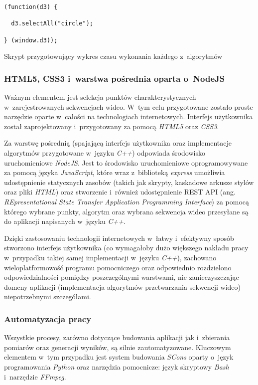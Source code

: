       \begin{sample}[ht]
        \begin{verbatim}
(function(d3) {

  d3.selectAll("circle");

} (window.d3));
        \end{verbatim}
        \caption{Skrypt przygotowujący wykres czasu wykonania każdego z~algorytmów}
        \label{ChartForRunningTimePerAlgorithm}
      \end{sample}

      \subsubsection{HTML5, CSS3 i~warstwa pośrednia oparta o~NodeJS}\label{Subsection_NodeJS}
      Ważnym elementem jest selekcja punktów charakterystycznych w~zarejestrowanych sekwencjach wideo. W~tym celu przygotowane zostało proste narzędzie oparte w~całości na technologiach internetowych. Interfejs użytkownika został zaprojektowany i~przygotowany za pomocą \textit{HTML5} oraz \textit{CSS3}.

      Za warstwę pośrednią (spajającą interfejs użytkownika oraz implementacje algorytmów przygotowane w~języku \textit{C++}) odpowiada środowisko uruchomieniowe \textit{NodeJS}. Jest to środowisko uruchomieniowe oprogramowywane za pomocą języka \textit{JavaScript}, które wraz z~biblioteką \textit{express} umożliwia udostępnienie statycznych zasobów (takich jak skrypty, kaskadowe arkusze stylów oraz pliki \textit{HTML}) oraz stworzenie i~również udostępnienie REST API (ang. \textit{REpresentational State Transfer Application Programming Interface}) za pomocą którego wybrane punkty, algorytm oraz wybrana sekwencja wideo przesyłane są do aplikacji napisanych w~języku \textit{C++}.

      Dzięki zastosowaniu technologii internetowych w~łatwy i~efektywny sposób stworzono interfejs użytkownika (co wymagałoby dużo większego nakładu pracy w~przypadku takiej samej implementacji w~języku \textit{C++}), zachowano wieloplatformowość programu pomocniczego oraz odpowiednio rozdzielono odpowiedzialności pomiędzy poszczególnymi warstwami, nie zanieczyszczając domeny aplikacji (implementacja algorytmów przetwarzania sekwencji wideo) niepotrzebnymi szczegółami.

      \subsubsection{Automatyzacja pracy}
      Wszystkie procesy, zarówno dotyczące budowania aplikacji jak i~zbierania pomiarów oraz generacji wyników, są silnie zautomatyzowane. Kluczowym elementem w~tym przypadku jest system budowania \textit{SCons} oparty o~język programowania \textit{Python} oraz narzędzia pomocnicze: język skryptowy \textit{Bash} i~narzędzie \textit{FFmpeg}.

